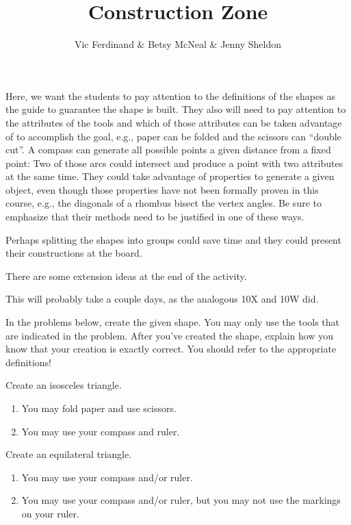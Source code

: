 \documentclass{ximera}
\title{Construction Zone}
\author{Vic Ferdinand \& Betsy McNeal \& Jenny Sheldon}
\begin{document}
\begin{abstract}
\end{abstract}
\maketitle

\begin{instructorIntro}
Here, we want the students to pay attention to the definitions of the shapes as the guide to guarantee the shape is built.  They also will need to pay attention to the attributes of the tools and which of those attributes can be taken advantage of to accomplish the goal, e.g., paper can be folded and the scissors can “double cut”.  A compass can generate all possible points a given distance from a fixed point:  Two of those arcs could intersect and produce a point with two attributes at the same time.   
     They could take advantage of properties to generate a given object, even though those properties have not been formally proven in this course, e.g., the diagonals of a rhombus bisect the vertex angles.  Be sure to emphasize that their methods need to be justified in one of these ways.
     
     Perhaps splitting the shapes into groups could save time and they could present their constructions at the board.
     
  There are some extension ideas at the end of the activity.
    
    This will probably take a couple days, as the analogous 10X and 10W did.
\end{instructorIntro}

In the problems below, create the given shape.  You may only use the tools that are indicated in the problem.  After you've created the shape, explain how you know that your creation is exactly correct.  You should refer to the appropriate definitions!

\begin{problem}
Create an isosceles triangle.
\begin{enumerate}
\item You may fold paper and use scissors.
\item You may use your compass and ruler.
\end{enumerate}
\end{problem}

\begin{problem}
Create an equilateral triangle.
\begin{enumerate}

\item You may use your compass and/or ruler.
\item You may use your compass and/or ruler, but you may not use the markings on your ruler.
\end{enumerate}
\end{problem}
\end{document}
